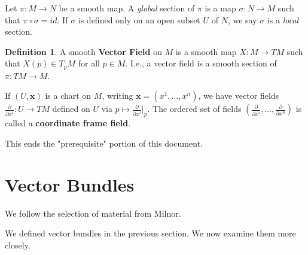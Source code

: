 \documentclass{article}
\theoremstyle{definition}
\newtheorem{defn}{Definition}[section]
\let\vec\mathbf
\begin{document}
Let $\pi:M\rightarrow N$ be a smooth map. A \textit{global} section of $\pi$ is a map $\sigma:N\rightarrow M$ such that $\pi\circ\sigma=id.$ If $\sigma$ is defined only on an open subset $U$ of $N$, we say $\sigma$ is a \textit{local} section. 
\begin{defn}
A smooth \textbf{Vector Field} on $M$ is a smooth map $X:M\rightarrow TM$ such that $X(p)\in T_{p}M$ for all $p\in M.$ I.e., a vector field is a smooth section of $\pi:TM\rightarrow M$.
\end{defn}
If $(U,\vec{x})$ is a chart on $M$, writing $\vec{x}=(x^{1},\dots,x^{n})$, we have vector fields $\frac{\partial}{\partial x^{i}}:U\rightarrow TM$ defined on $U$ via $p\mapsto\frac{\partial}{\partial x^{i}}|_{p}.$ The ordered set of fields $(\frac{\partial}{\partial x^{i}},\dots,\frac{\partial}{\partial x^{n}})$ is called a \textbf{coordinate frame field}.

This ends the "prerequisite" portion of this document. \section{Vector Bundles}
We follow the selection of material from Milnor\cite{Milnor}.

We defined vector bundles in the previous section. We now examine them more closely.
\end{document}
